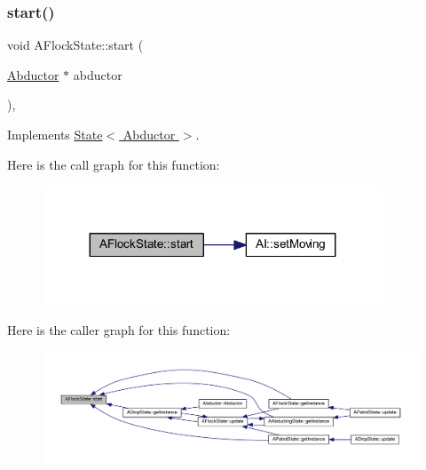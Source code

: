 \subsubsection{\texorpdfstring{start()}{start()}}
{\footnotesize\ttfamily void A\+Flock\+State\+::start (\begin{DoxyParamCaption}\item[{\hyperlink{class_abductor}{Abductor} $\ast$}]{abductor }\end{DoxyParamCaption})\hspace{0.3cm}{\ttfamily [override]}, {\ttfamily [virtual]}}



Implements \hyperlink{class_state_abc29d36b0462a306ac9b32f36571d783}{State$<$ Abductor $>$}.

Here is the call graph for this function\+:
\nopagebreak
\begin{figure}[H]
\begin{center}
\leavevmode
\includegraphics[width=287pt]{class_a_flock_state_a375255af2422bad8037325ea8ff86ddb_cgraph}
\end{center}
\end{figure}
Here is the caller graph for this function\+:
\nopagebreak
\begin{figure}[H]
\begin{center}
\leavevmode
\includegraphics[width=350pt]{class_a_flock_state_a375255af2422bad8037325ea8ff86ddb_icgraph}
\end{center}
\end{figure}
\mbox{\label{class_a_flock_state_ac452fa27fac302918460575e5badae91}} 
